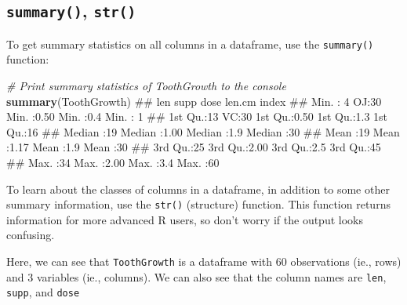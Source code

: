 \documentclass[]{book}
\newenvironment{Shaded}{\begin{snugshade}}{\end{snugshade}}
\newcommand{\KeywordTok}[1]{\textcolor[rgb]{0.13,0.29,0.53}{\textbf{{#1}}}}
\newcommand{\CommentTok}[1]{\textcolor[rgb]{0.56,0.35,0.01}{\textit{{#1}}}}
\newcommand{\NormalTok}[1]{{#1}}
\theoremstyle{definition}
\theoremstyle{definition}
\theoremstyle{remark}
\begin{document}
\subsection{\texorpdfstring{\texttt{summary()},
\texttt{str()}}{summary(), str()}}\label{summary-str}

To get summary statistics on all columns in a dataframe, use the
\texttt{summary()} function:

\begin{Shaded}
\begin{Highlighting}[]
\CommentTok{# Print summary statistics of ToothGrowth to the console}
\KeywordTok{summary}\NormalTok{(ToothGrowth)}
\NormalTok{##       len     supp         dose          len.cm        index   }
\NormalTok{##  Min.   : 4   OJ:30   Min.   :0.50   Min.   :0.4   Min.   : 1  }
\NormalTok{##  1st Qu.:13   VC:30   1st Qu.:0.50   1st Qu.:1.3   1st Qu.:16  }
\NormalTok{##  Median :19           Median :1.00   Median :1.9   Median :30  }
\NormalTok{##  Mean   :19           Mean   :1.17   Mean   :1.9   Mean   :30  }
\NormalTok{##  3rd Qu.:25           3rd Qu.:2.00   3rd Qu.:2.5   3rd Qu.:45  }
\NormalTok{##  Max.   :34           Max.   :2.00   Max.   :3.4   Max.   :60}
\end{Highlighting}
\end{Shaded}

To learn about the classes of columns in a dataframe, in addition to
some other summary information, use the \texttt{str()} (structure)
function. This function returns information for more advanced R users,
so don't worry if the output looks confusing.

\begin{Shaded}
\end{Shaded}

Here, we can see that \texttt{ToothGrowth} is a dataframe with 60
observations (ie., rows) and 3 variables (ie., columns). We can also see
that the column names are \texttt{len}, \texttt{supp}, and \texttt{dose}
\end{document}
